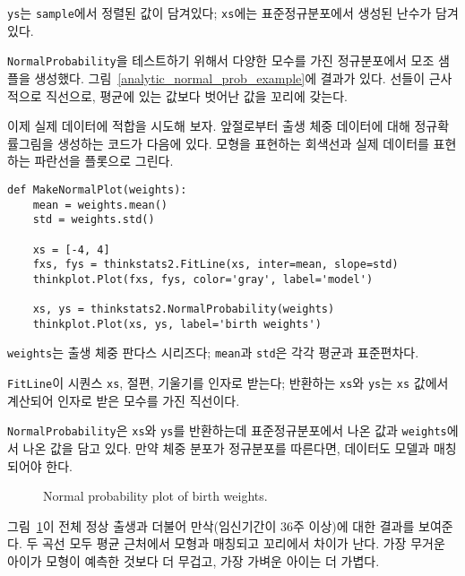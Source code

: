 {\tt ys}는 {\tt sample}에서 정렬된 값이 담겨있다; 
{\tt xs}에는 표준정규분포에서 생성된 난수가 담겨있다.

{\tt NormalProbability}을 테스트하기 위해서 다양한 모수를 가진 
정규분포에서 모조 샘플을 생성했다.
그림~\ref{analytic_normal_prob_example}에 결과가 있다.
선들이 근사적으로 직선으로, 평균에 있는 값보다 벗어난 값을 꼬리에 갖는다.

이제 실제 데이터에 적합을 시도해 보자.
앞절로부터 출생 체중 데이터에 대해 정규확률그림을 생성하는 코드가 다음에 있다.
모형을 표현하는 회색선과 실제 데이터를 표현하는 파란선을 플롯으로 그린다.


\begin{verbatim}
def MakeNormalPlot(weights):
    mean = weights.mean()
    std = weights.std()

    xs = [-4, 4]
    fxs, fys = thinkstats2.FitLine(xs, inter=mean, slope=std)
    thinkplot.Plot(fxs, fys, color='gray', label='model')

    xs, ys = thinkstats2.NormalProbability(weights)
    thinkplot.Plot(xs, ys, label='birth weights')
\end{verbatim}

{\tt weights}는 출생 체중 판다스 시리즈다; {\tt mean}과 {\tt std}은
각각 평균과 표준편차다.

{\tt FitLine}이 시퀀스 {\tt xs}, 절편, 기울기를 인자로 받는다;
반환하는 {\tt xs}와 {\tt ys}는 {\tt xs} 값에서 계산되어 인자로 받은 모수를 가진 직선이다.

{\tt NormalProbability}은 {\tt xs}와 {\tt ys}를 반환하는데 
표준정규분포에서 나온 값과 {\tt weights}에서 나온 값을 담고 있다.
만약 체중 분포가 정규분포를 따른다면, 데이터도 모델과 매칭되어야 한다.


\begin{figure}
\caption{Normal probability plot of birth weights.}
\label{analytic_birthwgt_normal}
\end{figure}

그림~\ref{analytic_birthwgt_normal}이 전체 정상 출생과 더불어 만삭(임신기간이 36주 이상)에 대한 결과를 보여준다.
두 곡선 모두 평균 근처에서 모형과 매칭되고 꼬리에서 차이가 난다.
가장 무거운 아이가 모형이 예측한 것보다 더 무겁고, 가장 가벼운 아이는 더 가볍다.


